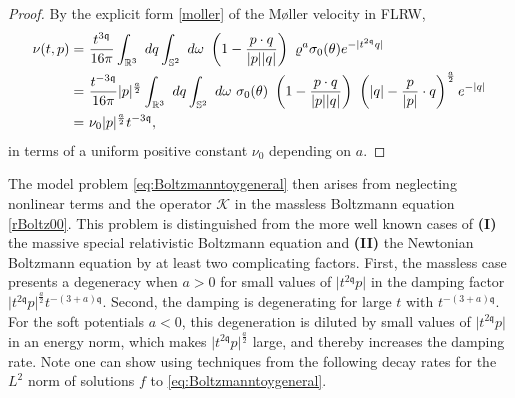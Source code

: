 \documentclass[reqno]{amsart}
\newcommand{\pv}{p}
\newcommand{\pZ}{|\pv|}
\newcommand{\qv}{q}
\newcommand{\qZ}{|\qv|}
\newcommand{\qq}{\mathfrak{q}}
\newcommand{\tqq}{t^{2\qq}}
\newcommand{\mrel}{\varrho}
\theoremstyle{definition}
\numberwithin{equation}{section}
\numberwithin{theorem}{section}
\begin{document}
\begin{proof}
    By the explicit form \eqref{moller} of the Møller velocity in FLRW, 
    \begin{align} \notag 
    \nu(t,p) =&~
\frac{t^{3\qq}}{16\pi}
\int_{\mathbb{R}^3} ~  dq 
\int_{\mathbb{S}^{2}} ~ d\omega
~  \left(1 - \frac{p\cdot q}{\pZ\qZ}\right) ~
\mrel^a \sigma_0(\theta)
    e^{-{| \tqq q|}}
    \\ \notag
    =&~
\frac{t^{-3\qq}}{16\pi}
  |\pv|^{\frac{a}{2}}
\int_{\mathbb{R}^3} ~  dq 
\int_{\mathbb{S}^{2}} ~ d\omega ~\sigma_0(\theta)
~  \left(1 - \frac{p\cdot q}{\pZ\qZ}\right) ~
  \left(|q| - \frac{p}{\pZ}\cdot q\right)^{\frac{a}{2}}  e^{-{|  q|}}
      \\ \notag
    =&~
    \nu_0 |\pv|^{\frac{a}{2}} t^{-3\qq},
\end{align}
in terms of a uniform positive constant \(\nu_0\) depending on \(a\). 
\end{proof}



The model problem \eqref{eq:Boltzmanntoygeneral} then arises from neglecting nonlinear terms and the operator \(\mathcal{K}\) in the massless Boltzmann equation \eqref{rBoltz00}. This problem is distinguished from the more well known cases of {\bf (I)} the massive special relativistic Boltzmann equation and {\bf (II)} the Newtonian Boltzmann equation by at least two complicating factors. First, the massless case presents a degeneracy when $a>0$ for small values of $\vert \tqq p \vert$ in the damping factor ${ \vert \tqq p \vert^{\frac{a}{2}}} t^{-(3+a)\qq}$. Second, the damping is degenerating for large $t$ with $t^{-(3+a)\qq}$.  For the soft potentials $a<0$, this degeneration is diluted by small values of $\vert \tqq p \vert$ in an energy norm, which makes ${ \vert \tqq p \vert^{\frac{a}{2}}}$ large, and thereby increases the damping rate. Note one can show using techniques from \cite{MR2366140} the following decay rates for the \(L^2\) norm of solutions \(f\) to \eqref{eq:Boltzmanntoygeneral}.
\end{document}
